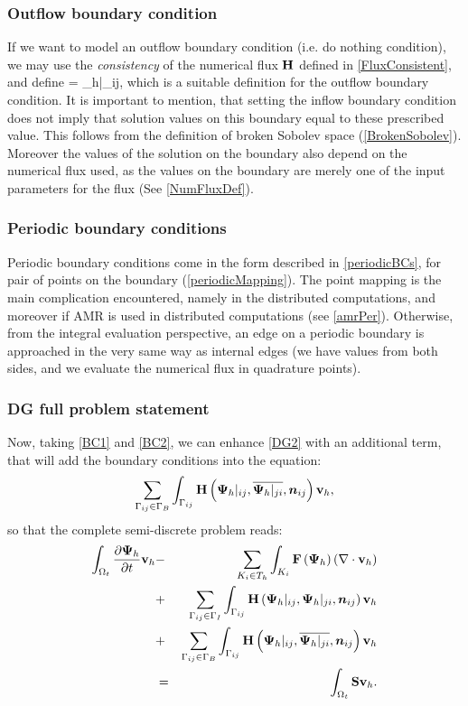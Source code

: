 \subsubsection{Outflow boundary condition}
If we want to model an outflow boundary condition (i.e. do nothing condition), we may use the \textit{consistency} of the numerical flux $\mathrm{\mathbf{H}}$ defined in \ref{FluxConsistent}, and define
\be
\label{BC2}  = {\mrPsi_h}|_{ij},
\ee
which is a suitable definition for the outflow boundary condition. It is important to mention, that setting the inflow boundary condition does not imply that solution values on this boundary equal to these prescribed value. This follows from the definition of broken Sobolev space (\ref{BrokenSobolev}). Moreover the values of the solution on the boundary also depend on the numerical flux used, as the values on the boundary are merely one of the input parameters for the flux (See \ref{NumFluxDef}).

\subsubsection{Periodic boundary conditions}
\label{sec:periodicDg}
Periodic boundary conditions come in the form described in \ref{periodicBCs}, for pair of points on the boundary (\ref{periodicMapping}). The point mapping is the main complication encountered, namely in the distributed computations, and moreover if AMR is used in distributed computations (see \ref{amrPer}). Otherwise, from the integral evaluation perspective, an edge on a periodic boundary is approached in the very same way as internal edges (we have values from both sides, and we evaluate the numerical flux in quadrature points).

\subsubsection{DG full problem statement}
Now, taking \ref{BC1} and \ref{BC2}, we can enhance \ref{DG2} with an additional term, that will add the boundary conditions into the equation:
$$
\sum_{\Gamma_{ij}\in\Gamma_B} \int_{\Gamma_{ij}} \mathrm{\mathbf{H}}\left({\mathrm{\mathbf{\Psi}}_h}|_{ij}, \overline{{\mathrm{\mathbf{\Psi}}_h}|_{ji}}, \mbox{\boldmath $n$}_{ij}\right) \mathrm{\mathbf{v}}_h,
$$
so that the complete semi-discrete problem reads:
\begin{eqnarray}
\label{DG3} \int_{\Omega_{t}} \frac{\partial{{\mathrm{\mathbf{\Psi}}_h}}}{\partial{t}} \mathrm{\mathbf{v}}_h & - & \sum_{K_i \in T_h}\int_{K_i}\mathrm{\mathbf{F}}\left({\mathrm{\mathbf{\Psi}}_h}\right) \left(\nabla \cdot \mathrm{\mathbf{v}}_h\right)\\ \nonumber & + & \sum_{\Gamma_{ij}\in\Gamma_I} \int_{\Gamma_{ij}} \mathrm{\mathbf{H}}\left({\mathrm{\mathbf{\Psi}}_h}|_{ij}, {\mathrm{\mathbf{\Psi}}_h}|_{ji}, \mbox{\boldmath $n$}_{ij}\right) \mathrm{\mathbf{v}}_h\\\nonumber
 & + & \sum_{\Gamma_{ij}\in\Gamma_B} \int_{\Gamma_{ij}} \mathrm{\mathbf{H}}\left({\mathrm{\mathbf{\Psi}}_h}|_{ij}, \overline{{\mathrm{\mathbf{\Psi}}_h}|_{ji}}, \mbox{\boldmath $n$}_{ij}\right) \mathrm{\mathbf{v}}_h\\\nonumber
 & = & \int_{\Omega_{t}} \mathrm{\mathbf{S}} \mathrm{\mathbf{v}}_h.
\end{eqnarray}

